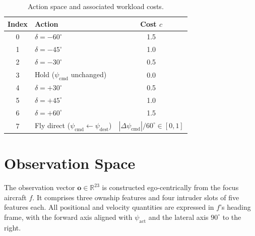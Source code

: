\documentclass[11pt, a4paper]{article}
\begin{document}
\begin{table}[h]
\centering
\caption{Action space and associated workload costs.}
\label{tab:actions}
\smallskip
\begin{tabular}{clc}
\toprule
\textbf{Index} & \textbf{Action} & \textbf{Cost $c$} \\
\midrule
0 & $\delta = -60^\circ$ & 1.5 \\
1 & $\delta = -45^\circ$ & 1.0 \\
2 & $\delta = -30^\circ$ & 0.5 \\
3 & Hold ($\psi_\text{cmd}$ unchanged) & 0.0 \\
4 & $\delta = +30^\circ$ & 0.5 \\
5 & $\delta = +45^\circ$ & 1.0 \\
6 & $\delta = +60^\circ$ & 1.5 \\
7 & Fly direct ($\psi_\text{cmd} \leftarrow \psi_\text{dest}$) & $|\Delta\psi_\text{cmd}|/60^\circ \in [0,1]$ \\
\bottomrule
\end{tabular}
\end{table}

\section{Observation Space}
\label{sec:obs}

The observation vector $\mathbf{o} \in \mathbb{R}^{23}$ is constructed
ego-centrically from the focus aircraft $f$.
It comprises three ownship features and four intruder slots of five features
each.
All positional and velocity quantities are expressed in $f$'s heading frame,
with the forward axis aligned with $\psi_\text{act}$ and the lateral axis
$90^\circ$ to the right.
\end{document}

